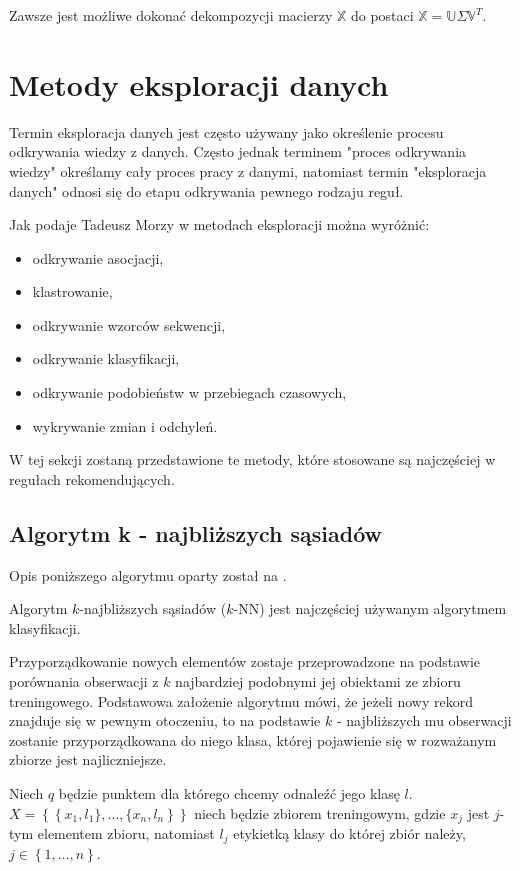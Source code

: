 \documentclass[12pt,a4paper]{report}
\newcommand{\set}[1]{\left\lbrace {#1} \right\rbrace}
\begin{document}
Zawsze jest możliwe dokonać dekompozycji macierzy $\mathbb{X}$ do postaci $\mathbb{X}=\mathbb{U} \Sigma \mathbb{V}^T$.

\section{Metody eksploracji danych}

Termin eksploracja danych jest często używany jako określenie procesu odkrywania wiedzy z danych. Często jednak terminem  "proces odkrywania wiedzy" określamy cały proces pracy z danymi, natomiast termin "eksploracja danych" odnosi się do etapu odkrywania pewnego rodzaju reguł.

Jak podaje Tadeusz Morzy \citep{edmia} w metodach eksploracji można wyróżnić:
\begin{itemize}
\item odkrywanie asocjacji,
\item klastrowanie,
\item odkrywanie wzorców sekwencji,
\item odkrywanie klasyfikacji,
\item odkrywanie podobieństw w przebiegach czasowych,
\item wykrywanie zmian i odchyleń.
\end{itemize}

W tej sekcji zostaną przedstawione te metody, które stosowane są najczęściej w regułach rekomendujących.


\subsection{Algorytm k - najbliższych sąsiadów }
Opis poniższego algorytmu oparty został na {\citep[Sec 2.3.1]{rsh}}.

Algorytm $k$-najbliższych sąsiadów ($k$-NN) jest najczęściej używanym algorytmem klasyfikacji.
 
Przyporządkowanie nowych elementów zostaje przeprowadzone na podstawie porównania obserwacji z $k$ najbardziej podobnymi jej obiektami ze zbioru treningowego. Podstawowa założenie algorytmu mówi, że jeżeli nowy rekord znajduje się w pewnym otoczeniu, to na podstawie $k$ - najbliższych mu obserwacji zostanie przyporządkowana do niego klasa, której pojawienie się w rozważanym zbiorze jest najliczniejsze.

Niech $q$ będzie punktem dla którego chcemy odnaleźć jego klasę $l$. 
\\$\mathit{X}=\set{\set{x_1,l_1\},\ldots,\{x_n,l_n}}$ niech będzie zbiorem treningowym, gdzie $x_j$ jest $j$-tym elementem zbioru, natomiast $l_j$ etykietką klasy do której zbiór należy, $j\in\set{1,\ldots,n}$.
\end{document}

